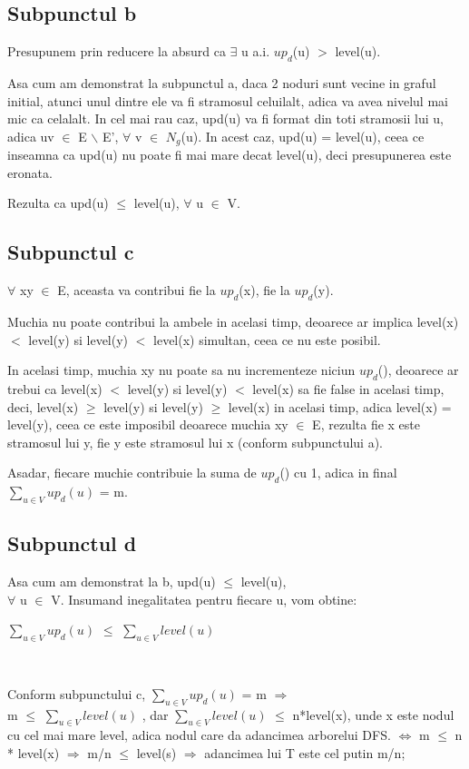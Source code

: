 \documentclass{article}
\begin{document}
\subsection*{\fontsize{16}{30}\selectfont Subpunctul b}
{\fontsize{14}{16}\selectfont
Presupunem prin reducere la absurd ca $\exists$ u a.i. $up_d$(u) $>$ level(u). 
\par Asa cum am demonstrat la subpunctul a, daca 2 noduri sunt vecine in graful initial, atunci unul dintre ele va fi stramosul celuilalt, adica va avea nivelul mai mic ca celalalt.  In cel mai rau caz, upd(u) va fi format din toti stramosii lui u, adica uv $\in$ E $\backslash$ E', $\forall$ v $\in$ $N_g$(u). In acest caz, upd(u) = level(u), ceea ce inseamna ca upd(u) nu poate fi mai mare decat level(u), deci presupunerea este eronata.
\par Rezulta ca upd(u) $\le$ level(u), $\forall$ u $\in$ V. }
\subsection*{\fontsize{16}{30}\selectfont Subpunctul c}
{\fontsize{14}{16}\selectfont
$\forall$ xy $\in$ E, aceasta va contribui fie la $up_d$(x), fie la $up_d$(y).
\par Muchia nu poate contribui la ambele in acelasi timp, deoarece ar implica level(x) $<$ level(y) si level(y) $<$ level(x) simultan, ceea ce nu este posibil. 
\par In acelasi timp, muchia xy nu poate sa nu incrementeze niciun $up_d$(), deoarece ar trebui ca level(x) $<$ level(y) si level(y) $<$ level(x) sa fie false in acelasi timp, deci, level(x) $\ge$ level(y) si level(y) $\ge$ level(x) in acelasi timp, adica level(x) = level(y), ceea ce este imposibil deoarece muchia xy $\in$ E, rezulta fie x este stramosul lui y, fie y este stramosul lui x (conform subpunctului a).
\par Asadar, fiecare muchie contribuie la suma de $up_d$() cu 1, adica in final $\sum_{u \in V} {up}_d(u)$
 = m.
}
\subsection*{\fontsize{16}{30}\selectfont Subpunctul d}
{\fontsize{14}{16}\selectfont
Asa cum am demonstrat la b, upd(u) $\le$ level(u), \\ $\forall$ u $\in$ V. Insumand inegalitatea pentru fiecare u, vom obtine:  \\
 \centerline {$\sum_{u \in V} {up}_d(u)$ $\le$ $\sum_{u \in V} {level(u)}$ } \\
 \par Conform subpunctului c, $\sum_{u \in V} {up}_d(u)$ = m $\Rightarrow$ \\ m $\le$ $\sum_{u \in V} {level(u)}$ , dar $\sum_{u \in V} {level(u)}$ $\le$ n*level(x), unde x este nodul cu cel mai mare level, adica nodul care da adancimea arborelui DFS. $\Leftrightarrow$ m $\le$ n * level(x) $\Rightarrow$ m/n $\le$ level(s) $\Rightarrow$ adancimea lui T este cel putin m/n; 
}
\end{document}
